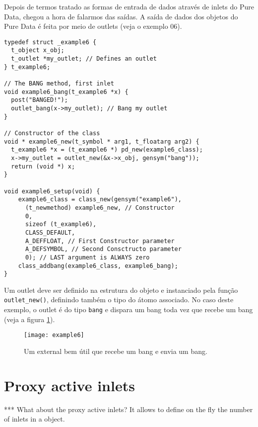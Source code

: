 Depois de termos tratado as formas de entrada de dados através de inlets do
Pure Data, chegou a hora de falarmos das saídas. A saída de dados dos objetos
do Pure Data é feita por meio de outlets (veja o exemplo 06).

\begin{lstlisting}
typedef struct _example6 {
  t_object x_obj;
  t_outlet *my_outlet; // Defines an outlet
} t_example6;

// The BANG method, first inlet
void example6_bang(t_example6 *x) {
  post("BANGED!");
  outlet_bang(x->my_outlet); // Bang my outlet
}

// Constructor of the class
void * example6_new(t_symbol * arg1, t_floatarg arg2) {
  t_example6 *x = (t_example6 *) pd_new(example6_class);
  x->my_outlet = outlet_new(&x->x_obj, gensym("bang"));
  return (void *) x;
}

void example6_setup(void) {
    example6_class = class_new(gensym("example6"),
      (t_newmethod) example6_new, // Constructor
      0, 
      sizeof (t_example6),
      CLASS_DEFAULT,
      A_DEFFLOAT, // First Constructor parameter
      A_DEFSYMBOL, // Second Consctructo parameter
      0); // LAST argument is ALWAYS zero
    class_addbang(example6_class, example6_bang);
}
\end{lstlisting}

Um outlet deve ser definido na estrutura do objeto e instanciado pela função
\texttt{outlet\_new()}, definindo também o tipo do átomo associado. No caso
deste exemplo, o outlet é do tipo \texttt{bang} e dispara um bang toda vez que
recebe um bang (veja a figura \ref{fig:outlet-bang}).

\begin{figure}[h!]
\centering
\texttt{[image: example6]}
\caption{Um external bem útil que recebe um bang e envia um bang.}
\label{fig:outlet-bang}
\end{figure}


\section{Proxy active inlets}

*** What about the proxy active inlets? It allows to define on the fly the
number of inlets in a object.

